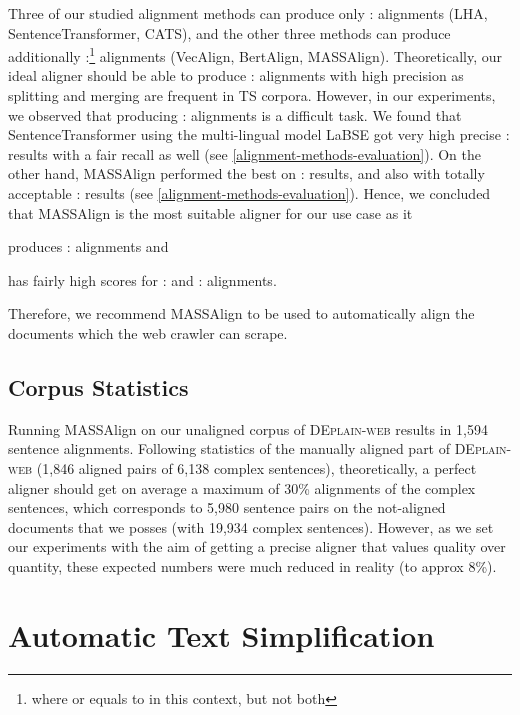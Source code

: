 \documentclass[11pt]{article}
\begin{document}
Three of our studied alignment methods can produce only : alignments (LHA, SentenceTransformer, CATS), and the other three methods can produce additionally :\footnote{where  or  equals to  in this context, but not both} alignments (VecAlign, BertAlign, MASSAlign). Theoretically, our ideal aligner should be able to produce : alignments with high precision as splitting and merging are frequent in TS corpora. However, in our experiments, we observed that producing : alignments is a difficult task. We found that SentenceTransformer using the multi-lingual model LaBSE \cite{feng-etal-2022-language} got very high precise : results with a fair recall as well (see \autoref{alignment-methods-evaluation}). On the other hand, MASSAlign performed the best on : results, and also with totally acceptable : results (see \autoref{alignment-methods-evaluation}). Hence, we concluded that MASSAlign is the most suitable aligner for our use case as it 
\begin{enumerate*}[label=\roman*)]
    \item produces : alignments and 
    \item has fairly high scores for : and : alignments.
\end{enumerate*}
Therefore, we recommend MASSAlign to be used to automatically align the documents which the web crawler can scrape. 


\subsection{Corpus Statistics}

Running MASSAlign on our unaligned corpus of \textsc{DEplain-web} results in 1,594 sentence alignments. Following statistics of the manually aligned part of \textsc{DEplain-web} (1,846 aligned pairs of 6,138 complex sentences), theoretically, a perfect aligner should get on average a maximum of 30\% alignments of the complex sentences, which corresponds to 5,980 sentence pairs on the not-aligned documents that we posses (with 19,934 complex sentences). However, as we set our experiments with the aim of getting a precise aligner that values quality over quantity, these expected numbers were much reduced in reality (to approx 8\%). 



\section{Automatic Text Simplification}
\label{sec-ats}
\end{document}
